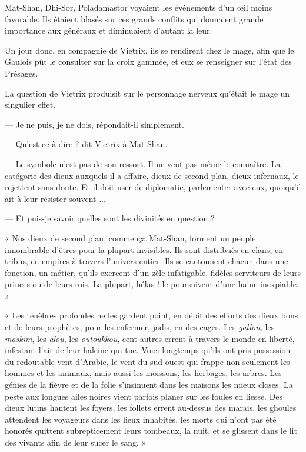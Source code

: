 \documentclass[a4paper, 11pt, oneside, polutonikogreek, french]{article}
\begin{document}
\bigskip
\centerline{\EightStarTaper}
\centerline{\EightStarTaper\EightStarTaper}
\bigskip

Mat-Shan, Dhi-Sor, Poladamastor voyaient les événements d'un œil moins favorable. Ils étaient blasés sur ces grands conflits qui donnaient grande importance aux généraux et diminuaient d'autant la leur.

Un jour donc, en compagnie de Vietrix, ils se rendirent chez le mage, afin que le Gaulois pût le consulter sur la croix gammée, et eux se renseigner sur l'état des Présages.

La question de Vietrix produisit sur le personnage nerveux qu'était le mage un singulier effet.

--- Je ne puis, je ne dois, répondait-il simplement.

--- Qu'est-ce à dire ? dit Vietrix à Mat-Shan.

--- Le symbole n'est pas de son ressort. Il ne veut pas même le connaître. La catégorie des dieux auxquels il a affaire, dieux de second plan, dieux infernaux, le rejettent sans doute. Et il doit user de diplomatie, parlementer avec eux, quoiqu'il ait à leur résister souvent ...

--- Et puis-je savoir quelles sont les divinités en question ?

\bigskip
\centerline{\EightStarTaper}
\centerline{\EightStarTaper\EightStarTaper}
\bigskip

« Nos dieux de second plan, commença Mat-Shan, forment un peuple innombrable d'êtres pour la plupart invisibles. Ils sont distribués en clans, en tribus, en empires à travers l'univers entier. Ils se cantonnent chacun dans une fonction, un métier, qu'ils exercent d'un zèle infatigable, fidèles serviteurs de leurs princes ou de leurs rois. La plupart, hélas ! le poursuivent d'une haine inexpiable. »

« Les ténèbres profondes ne les gardent point, en dépit des efforts des dieux bons et de leurs prophètes, pour les enfermer, jadis, en des cages. Les \emph{gallon}, les \emph{maskim}, les \emph{alou}, les \emph{outoukkou}, cent autres errent à travers le monde en liberté, infestant l'air de leur haleine qui tue. Voici longtemps qu'ils ont pris possession du redoutable vent d'Arabie, le vent du sud-ouest qui frappe non seulement les hommes et les animaux, mais aussi les moissons, les herbages, les arbres. Les génies de la fièvre et de la folie s'insinuent dans les maisons les mieux closes. La peste aux longues ailes noires vient parfois planer sur les foules en liesse. Des dieux lutins hantent les foyers, les follets errent au-dessus des marais, les ghoules attendent les voyageurs dans les lieux inhabités, les morts qui n'ont pas été honorés quittent subrepticement leurs tombeaux, la nuit, et se glissent dans le lit des vivants afin de leur sucer le sang. »
\end{document}
